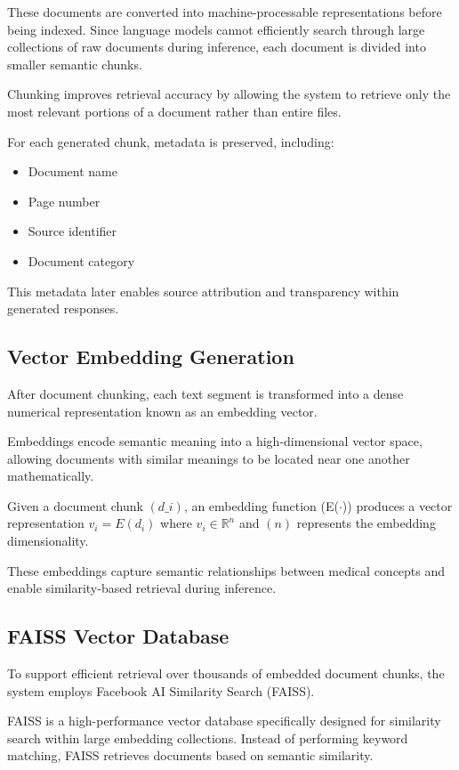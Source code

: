These documents are converted into machine-processable representations before being indexed. Since language models cannot efficiently search through large collections of raw documents during inference, each document is divided into smaller semantic chunks.

Chunking improves retrieval accuracy by allowing the system to retrieve only the most relevant portions of a document rather than entire files.

For each generated chunk, metadata is preserved, including:

\begin{itemize}
	\item Document name
	\item Page number
	\item Source identifier
	\item Document category
\end{itemize}

This metadata later enables source attribution and transparency within generated responses.

\subsection{Vector Embedding Generation}

After document chunking, each text segment is transformed into a dense numerical representation known as an embedding vector.

Embeddings encode semantic meaning into a high-dimensional vector space, allowing documents with similar meanings to be located near one another mathematically.

Given a document chunk $(d\_i)$, an embedding function (E($\cdot$)) produces a vector representation $v_i = E(d_i)$ 
where $v_i \in \mathbb{R}^{n}$ and $(n)$ represents the embedding dimensionality.

These embeddings capture semantic relationships between medical concepts and enable similarity-based retrieval during inference.

\subsection{FAISS Vector Database}

To support efficient retrieval over thousands of embedded document chunks, the system employs Facebook AI Similarity Search (FAISS).

FAISS is a high-performance vector database specifically designed for similarity search within large embedding collections. Instead of performing keyword matching, FAISS retrieves documents based on semantic similarity.

